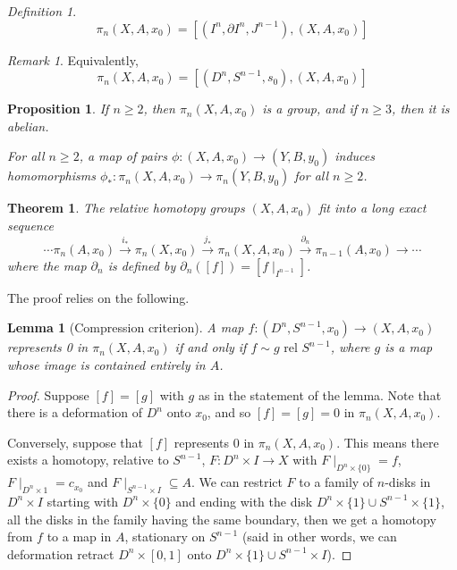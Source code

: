 \documentclass[a4paper]{tufte-book}
\newtheorem{Thm}[equation]{Theorem}
\newtheorem{Prop}[equation]{Proposition}
\newtheorem{Lem}[equation]{Lemma}
\theoremstyle{remark}
\newtheorem{Def}[equation]{Definition}
\newtheorem{Rem}[equation]{Remark}
\newcommand{\xr}{\xrightarrow}
\begin{document}
\begin{Def}
	\[
\pi_n(X,A,x_0) = [(I^n,\partial I^n,J^{n-1}),(X,A,x_0)]
	\]
\end{Def}
\begin{Rem}
	Equivalently, 
	\[
\pi_n(X,A,x_0) = [(D^n,S^{n-1},s_0),(X,A,x_0)]
	\]
\end{Rem}
\begin{Prop}
	If $n \ge 2$, then $\pi_n(X,A,x_0)$ is a group, and if $n \ge 3$, then it is abelian. 

	For all $n \ge 2$, a map of pairs $\phi \colon (X,A,x_0) \to (Y,B,y_0)$ induces homomorphisms $\phi_* \colon \pi_n(X,A,x_0) \to \pi_n(Y,B,y_0)$ for all $n \ge 2$. 
\end{Prop}
\begin{Thm}\label{thm:les_rel}
	The relative homotopy groups $(X,A,x_0)$ fit into a long exact sequence 
	\[
\cdots \pi_n(A,x_0) \xr{i_*} \pi_n(X,x_0) \xr{j_*} \pi_n(X,A,x_0) \xr{\partial_n} \pi_{n-1}(A,x_0) \to \cdots
	\]
	where the map $\partial_n$ is defined by $\partial_n([f]) = [f\mid_{I^{n-1}}]$. 
\end{Thm}
The proof relies on the following.
\begin{Lem}[Compression criterion]
	A map $f \colon (D^n,S^{n-1},x_0) \to (X,A,x_0)$ represents 0 in $\pi_n(X,A,x_0)$ if and only if $f \sim g \text{ rel } S^{n-1}$, where $g$ is a map whose image is contained entirely in $A$. 
\end{Lem}
\begin{proof}
	Suppose $[f] = [g]$ with $g$ as in the statement of the lemma. Note that there is a deformation of $D^n$ onto $x_0$, and so $[f] = [g] = 0$ in $\pi_n(X,A,x_0)$. 

	Conversely, suppose that $[f]$ represents 0 in $\pi_n(X,A,x_0)$. This means there exists a homotopy, relative to $S^{n-1}$, $F \colon D^n \times I \to X$ with $F \mid_{D^n \times \{0 \}} = f$, $F \mid_{D^n \times 1} = c_{x_0}$ and $F \mid_{S^{n-1} \times I} \subseteq A$. We can restrict $F$ to a family of $n$-disks in $D^n \times I$ starting with $D^n \times \{ 0 \}$ and ending with the disk $D^n \times \{1 \} \cup S^{n-1} \times \{ 1\}$, all the disks in the family having the same boundary, then we get a homotopy from $f$ to a map in $A$, stationary on $S^{n-1}$ (said in other words, we can deformation retract $D^n \times [0,1]$ onto $D^n \times \{1 \} \cup S^{n-1} \times I$). 
\end{proof}
\end{document}
